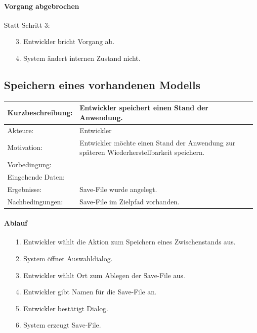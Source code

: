 \paragraph{Vorgang abgebrochen}
Statt Schritt 3:
\begin{itemize}[itemsep=0pt]
\item[3.] Entwickler bricht Vorgang ab. 
\item[4.] System ändert internen Zustand nicht. 
\end{itemize}

\subsection{Speichern eines vorhandenen Modells}
\label{sec:save}

\begin{tabular}[h]{|p{4cm}|p{}|}
\hline 
\rule[-1ex]{0pt}{2.5ex}Kurzbeschreibung: & 
Entwickler speichert einen Stand der Anwendung. \\  
\hline 
\rule[-1ex]{0pt}{2.5ex}Akteure: & 
Entwickler \\ 
\hline 
\rule[-1ex]{0pt}{2.5ex}Motivation: & 
Entwickler möchte einen Stand der Anwendung zur späteren Wiederherstellbarkeit speichern. \\ 
\hline 
\rule[-1ex]{0pt}{2.5ex}Vorbedingung: &  \\ 
\hline 
\rule[-1ex]{0pt}{2.5ex}Eingehende Daten: & \\ 
\hline 
\rule[-1ex]{0pt}{2.5ex}Ergebnisse: & Save-File wurde angelegt. \\ 
\hline 
\rule[-1ex]{0pt}{2.5ex}Nachbedingungen: & Save-File im Zielpfad vorhanden.  \\ 
\hline 
\end{tabular} 

\paragraph{Ablauf}

\begin{itemize}[itemsep=0pt]
\item[1.] Entwickler wählt die Aktion zum Speichern eines Zwischenstands aus.
\item[2.] System öffnet Auswahldialog. 
\item[3.] Entwickler wählt Ort zum Ablegen der Save-File aus.
\item[4.] Entwickler gibt Namen für die Save-File an.
\item[5.] Entwickler bestätigt Dialog.
\item[6.] System erzeugt Save-File.
\end{itemize}


